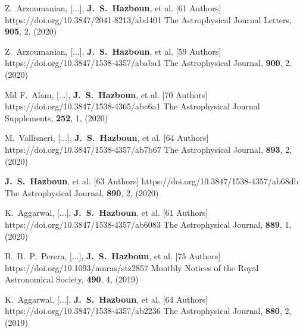          {Z.~{Arzoumanian}, [...], \textbf{J.~S.~{Hazboun}}, et al. [61 Authors]}
         {https://doi.org/10.3847/2041-8213/abd401}
         {{The Astrophysical Journal Letters}, \textbf{905}, 2, (2020)}

         {Z.~{Arzoumanian}, [...], \textbf{J.~S.~{Hazboun}}, et al. [59 Authors]}
         {https://doi.org/10.3847/1538-4357/ababa1}
         {{The Astrophysical Journal}, \textbf{900}, 2, (2020)}

         {Md F.~{Alam}, [...], \textbf{J.~S.~{Hazboun}}, et al. [70 Authors]}
         {https://doi.org/10.3847/1538-4365/abc6a1}
         {{The Astrophysical Journal Supplements}, \textbf{252}, 1, (2020)}

         {M.~{Vallisneri}, [...], \textbf{J.~S.~{Hazboun}}, et al. [64 Authors]}
         {https://doi.org/10.3847/1538-4357/ab7b67}
         {{The Astrophysical Journal}, \textbf{893}, 2, (2020)}

         {\textbf{J.~S.~{Hazboun}}, et al. [63 Authors]}
         {https://doi.org/10.3847/1538-4357/ab68db}
         {{The Astrophysical Journal}, \textbf{890}, 2, (2020)}

         {K.~{Aggarwal}, [...], \textbf{J.~S.~{Hazboun}}, et al. [61 Authors]}
         {https://doi.org/10.3847/1538-4357/ab6083}
         {{The Astrophysical Journal}, \textbf{889}, 1, (2020)}

         {B.~B.~P.~{Perera}, [...], \textbf{J.~S.~{Hazboun}}, et al. [75 Authors]}
         {https://doi.org/10.1093/mnras/stz2857}
         {{Monthly Notices of the Royal Astronomical Society}, \textbf{490}, 4, (2019)}

         {K.~{Aggarwal}, [...], \textbf{J.~S.~{Hazboun}}, et al. [64 Authors]}
         {https://doi.org/10.3847/1538-4357/ab2236}
         {{The Astrophysical Journal}, \textbf{880}, 2, (2019)}

